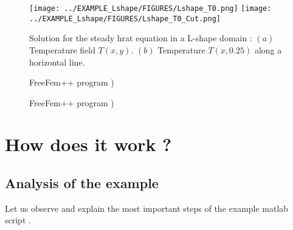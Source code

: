 \begin{figure*}[t]
\texttt{[image: ../EXAMPLE\_Lshape/FIGURES/Lshape\_T0.png]}
\texttt{[image: ../EXAMPLE\_Lshape/FIGURES/Lshape\_T0\_Cut.png]}
\caption{Solution for the steady hrat equation in a L-shape domain : $(a)$ Temperature field $T(x,y)$. 
$(b)$ Temperature $T(x,0.25)$ along a horizontal line. }
\label{Lshape_Figures}
\end{figure*}

\begin{figure*}[t]
\small

 \normalsize
\caption{
FreeFem++ program )}
\label{Lshape_Mesh.edp}
\end{figure*}


\begin{figure*}[t]
\small

\normalsize
\caption{
FreeFem++ program )}
\label{Lshape_Mesh.edp}
\end{figure*}


\clearpage

\section{How does it work ?}

\subsection{Analysis of the example}

Let us observe and explain the most important steps of the example matlab script . 

